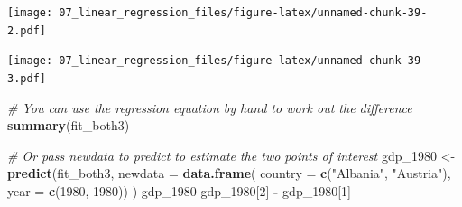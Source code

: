 \documentclass[
  12pt,
  krantz2]{krantz}
\makeatletter
\newenvironment{Shaded}{\begin{snugshade}}{\end{snugshade}}
\newcommand{\CommentTok}[1]{\textcolor[rgb]{0.56,0.35,0.01}{\textit{#1}}}
\newcommand{\DataTypeTok}[1]{\textcolor[rgb]{0.13,0.29,0.53}{#1}}
\newcommand{\DecValTok}[1]{\textcolor[rgb]{0.00,0.00,0.81}{#1}}
\newcommand{\KeywordTok}[1]{\textcolor[rgb]{0.13,0.29,0.53}{\textbf{#1}}}
\newcommand{\NormalTok}[1]{#1}
\newcommand{\OperatorTok}[1]{\textcolor[rgb]{0.81,0.36,0.00}{\textbf{#1}}}
\newcommand{\StringTok}[1]{\textcolor[rgb]{0.31,0.60,0.02}{#1}}
\newenvironment{kframe}{%
\medskip{}
\setlength{\fboxsep}{.8em}
 \def\at@end@of@kframe{}%
 \ifinner\ifhmode%
  \def\at@end@of@kframe{\end{minipage}}%
  \begin{minipage}{\columnwidth}%
 \fi\fi%
 \def\FrameCommand##1{\hskip\@totalleftmargin \hskip-\fboxsep
 \colorbox{shadecolor}{##1}\hskip-\fboxsep
     \hskip-\linewidth \hskip-\@totalleftmargin \hskip\columnwidth}%
 \MakeFramed {\advance\hsize-\width
   \@totalleftmargin\z@ \linewidth\hsize
   \@setminipage}}%
 {\par\unskip\endMakeFramed%
 \at@end@of@kframe}
\renewenvironment{Shaded}{\begin{kframe}}{\end{kframe}}
\makeatother
\begin{document}
\texttt{[image: 07\_linear\_regression\_files/figure-latex/unnamed-chunk-39-2.pdf]}

\begin{Shaded}
\end{Shaded}

\texttt{[image: 07\_linear\_regression\_files/figure-latex/unnamed-chunk-39-3.pdf]}

\begin{Shaded}
\begin{Highlighting}[]
\CommentTok{# You can use the regression equation by hand to work out the difference}
\KeywordTok{summary}\NormalTok{(fit_both3)}

\CommentTok{# Or pass newdata to predict to estimate the two points of interest}
\NormalTok{gdp_}\DecValTok{1980}\NormalTok{ <-}\StringTok{ }\KeywordTok{predict}\NormalTok{(fit_both3, }\DataTypeTok{newdata =} \KeywordTok{data.frame}\NormalTok{(}
  \DataTypeTok{country =} \KeywordTok{c}\NormalTok{(}\StringTok{"Albania"}\NormalTok{, }\StringTok{"Austria"}\NormalTok{),}
  \DataTypeTok{year =} \KeywordTok{c}\NormalTok{(}\DecValTok{1980}\NormalTok{, }\DecValTok{1980}\NormalTok{))}
\NormalTok{)}
\NormalTok{gdp_}\DecValTok{1980}
\NormalTok{gdp_}\DecValTok{1980}\NormalTok{[}\DecValTok{2}\NormalTok{] }\OperatorTok{-}\StringTok{ }\NormalTok{gdp_}\DecValTok{1980}\NormalTok{[}\DecValTok{1}\NormalTok{]}
\end{Highlighting}
\end{Shaded}
\end{document}
